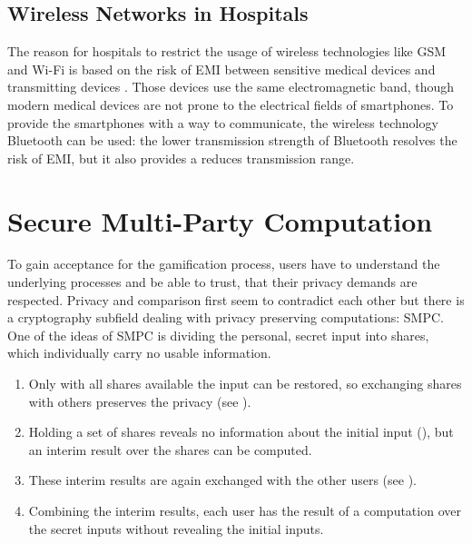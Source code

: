 \subsection{Wireless Networks in Hospitals} \label{Wireless Networks in Hospitals}
The reason for hospitals to restrict the usage of wireless technologies like \gls{GSM} and Wi-Fi is based on the risk of \gls{EMI} between sensitive medical devices and transmitting devices \autocite{Ishihara2014}. Those devices use the same electromagnetic band, though modern medical devices are not prone to the electrical fields of smartphones.
To provide the smartphones with a way to communicate, the wireless technology Bluetooth can be used: the lower transmission strength of Bluetooth resolves the risk of \gls{EMI}, but it also provides a reduces transmission range.

\section{Secure Multi-Party Computation} \label{Introduction: Secure Multi-Party Computation}
To gain acceptance for the gamification process, users have to understand the underlying processes and be able to trust, that their privacy demands are respected. Privacy and comparison first seem to contradict each other but there is a cryptography subfield dealing with privacy preserving computations: \gls{SMPC}.
One of the ideas of \gls{SMPC} is dividing the personal, secret input into shares, which individually carry no usable information.
\begin{enumerate}
	\item Only with all shares available the input can be restored, so exchanging shares with others preserves the privacy (see ). 
	\item Holding a set of shares reveals no information about the initial input (), but an interim result over the shares can be computed.
	\item  These interim results are again exchanged with the other users (see ). 
	\item Combining the interim results, each user has the result of a computation over the secret inputs without revealing the initial inputs.
\end{enumerate}


